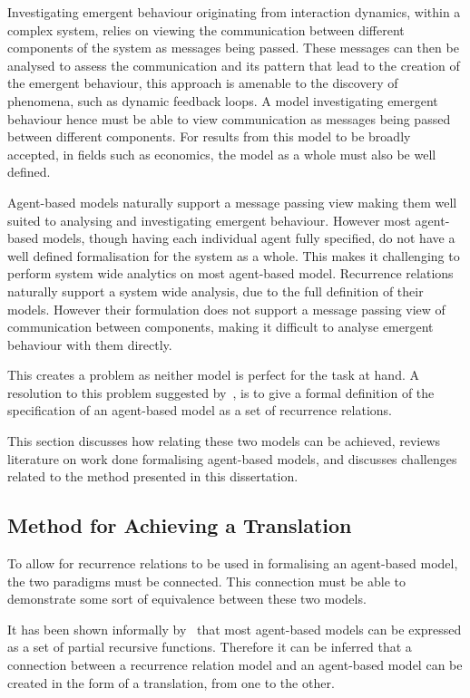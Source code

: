 \documentclass{article}
\begin{document}
Investigating emergent behaviour originating from interaction dynamics, within a complex system, relies on viewing the communication between different components of the system as messages being passed. These messages can then be analysed to assess the communication and its pattern that lead to the creation of the emergent behaviour, this approach is amenable to the discovery of phenomena, such as dynamic feedback loops. A model investigating emergent behaviour hence must be able to view communication as messages being passed between different components. For results from this model to be broadly accepted, in fields such as economics, the model as a whole must also be well defined.      

Agent-based models naturally support a message passing view making them well suited to analysing and investigating emergent behaviour. However most agent-based models, though having each individual agent fully specified, do not have a well defined formalisation for the system as a whole. This makes it challenging to perform system wide analytics on most agent-based model. Recurrence relations naturally support a system wide analysis, due to the full definition of their models. However their formulation does not support a message passing view of communication between components, making it difficult to analyse emergent behaviour with them directly. 

This creates a problem as neither model is perfect for the task at hand. A resolution to this problem suggested by~\cite{econmistsnoabm}, is to give a formal definition of the specification of an agent-based model as a set of recurrence relations. 

This section discusses how relating these two models can be achieved, reviews literature on work done formalising agent-based models, and discusses challenges related to the method presented in this dissertation.  


\subsection{Method for Achieving a Translation}
To allow for recurrence relations to be used in formalising an agent-based model, the two paradigms must be connected. This connection must be able to demonstrate some sort of equivalence between these two models. 

It has been shown informally by~\cite{gabm3} that most agent-based models can be expressed as a set of partial recursive functions. Therefore it can be inferred that a connection between a recurrence relation model and an agent-based model can be created in the form of a translation, from one to the other. 
\end{document}
